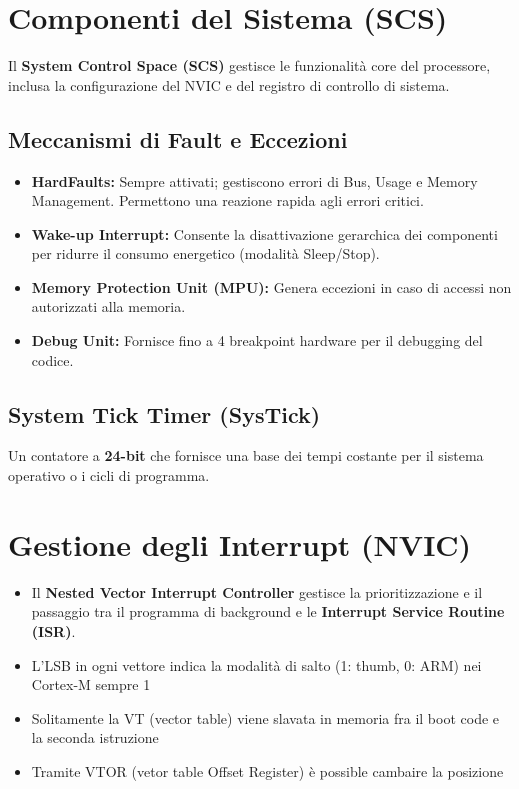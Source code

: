 
\section{Componenti del Sistema (SCS)}
Il \textbf{System Control Space (SCS)} gestisce le funzionalità core del processore, inclusa la configurazione del NVIC e del registro di controllo di sistema.

\subsection{Meccanismi di Fault e Eccezioni}
\begin{itemize}
    \item \textbf{HardFaults:} Sempre attivati; gestiscono errori di Bus, Usage e Memory Management. Permettono una reazione rapida agli errori critici.
    \item \textbf{Wake-up Interrupt:} Consente la disattivazione gerarchica dei componenti
     per ridurre il consumo energetico (modalità Sleep/Stop).
    \item \textbf{Memory Protection Unit (MPU):} Genera eccezioni in caso di accessi non autorizzati alla memoria.
    \item \textbf{Debug Unit:} Fornisce fino a 4 breakpoint hardware per il debugging del codice.
\end{itemize}

\subsection{System Tick Timer (SysTick)}
Un contatore a \textbf{24-bit} che fornisce una base dei tempi costante per il sistema operativo o i cicli di programma.


\section{Gestione degli Interrupt (NVIC)}

\begin{itemize}
    \item Il \textbf{Nested Vector Interrupt Controller} gestisce la prioritizzazione e
     il passaggio tra il programma di background e le 
     \textbf{Interrupt Service Routine (ISR)}.
    \item L'LSB in ogni vettore indica la modalità di salto (1: thumb, 0: ARM) nei Cortex-M sempre 1
    \item Solitamente la VT (vector table) viene slavata in memoria fra il boot code e la seconda istruzione
    \item Tramite VTOR (vetor table Offset Register) è possible cambaire la posizione
\end{itemize}



